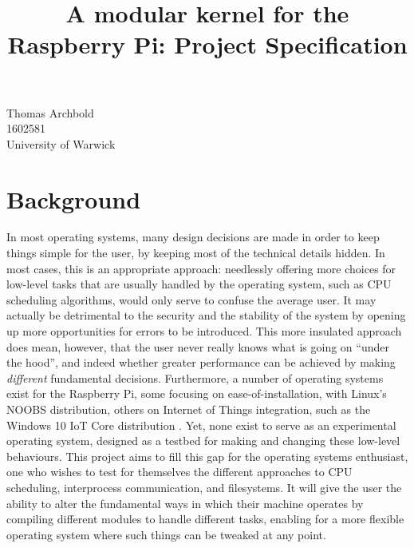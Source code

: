 \documentclass[10pt,a4paper]{article}
\title{A modular kernel for the Raspberry Pi: Project Specification}
\begin{document}
\maketitle

\begin{center}
    Thomas Archbold \\
    1602581 \\
    University of Warwick \\
\end{center}

\section*{Background}
In most operating systems, many design decisions are made in order to keep
things simple for the user, by keeping most of the technical details hidden. In
most cases, this is an appropriate approach: needlessly offering more choices
for low-level tasks that are usually handled by the operating system, such as
CPU scheduling algorithms, would only serve to confuse the average user. It may
actually be detrimental to the security and the stability of the system by
opening up more opportunities for errors to be introduced.  This more insulated
approach does mean, however, that the user never really knows what is going on
``under the hood'', and indeed whether greater performance can be achieved by
making \textit{different} fundamental decisions.  Furthermore, a number of
operating systems exist for the Raspberry Pi, some focusing on
ease-of-installation, with Linux's NOOBS \cite{NOOBS} distribution, others on
Internet of Things integration, such as the Windows 10 IoT Core distribution
\cite{IoT}. Yet, none exist to serve as an experimental operating system,
designed as a testbed for making and changing these low-level behaviours.  This
project aims to fill this gap for the operating systems enthusiast, one who
wishes to test for themselves the different approaches to CPU scheduling,
interprocess communication, and filesystems. It will give the user the ability
to alter the fundamental ways in which their machine operates by compiling
different modules to handle different tasks, enabling for a more flexible
operating system where such things can be tweaked at any point.
\end{document}

